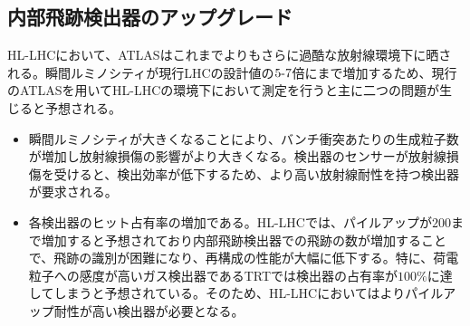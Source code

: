 \subsection{内部飛跡検出器のアップグレード}
\label{sec:hl-lhc-itk}
HL-LHCにおいて、ATLASはこれまでよりもさらに過酷な放射線環境下に晒される。瞬間ルミノシティが現行LHCの設計値の$5 \mathchar`- 7$倍にまで増加するため、現行のATLASを用いてHL-LHCの環境下において測定を行うと主に二つの問題が生じると予想される。
\begin{itemize}
\item 瞬間ルミノシティが大きくなることにより、バンチ衝突あたりの生成粒子数が増加し放射線損傷の影響がより大きくなる。検出器のセンサーが放射線損傷を受けると、検出効率が低下するため、より高い放射線耐性を持つ検出器が要求される。
\item 各検出器のヒット占有率の増加である。HL-LHCでは、パイルアップが$200$まで増加すると予想されており内部飛跡検出器での飛跡の数が増加することで、飛跡の識別が困難になり、再構成の性能が大幅に低下する。特に、荷電粒子への感度が高いガス検出器であるTRTでは検出器の占有率が$100\si{\%}$に達してしまうと予想されている。そのため、HL-LHCにおいてはよりパイルアップ耐性が高い検出器が必要となる。
\end{itemize}

